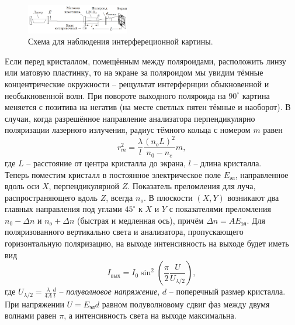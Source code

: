 \documentclass[a4paper,12pt]{article}
\begin{document}
\begin{figure}
\begin{center}
\includegraphics[width = 0.4\textwidth]{1.png}
\end{center}
\vspace{-40ptx}
\caption{Схема для наблюдения интерфереционной картины.}
\end{figure}
Если перед кристаллом, помещённым между поляроидами, расположить линзу или матовую пластинку, то на экране за поляроидом мы увидим тёмные концентрические окружности -- рещультат интерфернции обыкновенной и необыкновенной волн. При повороте выходного поляроида на $90^\circ$ картина меняется с позитива на негатив (на месте светлых пятен тёмные и наоборот). В случаи, когда разрешённое направление анализатора перпендикулярно поляризации лазерного излучения, радиус тёмного кольца с номером $m$ равен
\begin{equation}
r_m^2 = \dfrac{\lambda}{l} \dfrac{(n_oL)^2}{n_0 - n_e}m,
\end{equation}
где $L$ -- расстояние от центра кристалла до экрана, $l$ -- длина кристалла.\\
Теперь поместим кристалл в постоянное электрическое поле $E_{\text{эл}}$, направленное вдоль оси $X$, перпендикулярной $Z$. Показатель преломления для луча, распространяющего вдоль $Z$, всегда $n_o$. В плоскости $(X,Y)$ возникают два главных направления под углами $45^\circ$ к $X$ и $Y$ с показателями преломления $n_0 - \Delta n$ и $n_o + \Delta n$ (быстрая и медленная ось), причём $\Delta n = A E_{\text{эл}}$. Для поляризованного вертикально света и анализатора, пропускающего горизонтальную поляризацию, на выходе интенсивность на выходе будет иметь вид
\begin{equation}
I_{\text{вых}} = I_0 \sin^2 \left(\dfrac{\pi}{2} \dfrac{U}{U_{\lambda/2}} \right),
\end{equation}
где $U_{\lambda/2} = \frac{\lambda}{4A}\frac{d}{l}$ -- \textit{полуволновое напряжение}, $d$ -- поперечный размер кристалла.  При напряжении $U = E_{\text{эл}}d$ равном полуволновому сдвиг фаз между двумя волнами равен $\pi$, а интенсивность света на выходе максимальна. 
\end{document}
